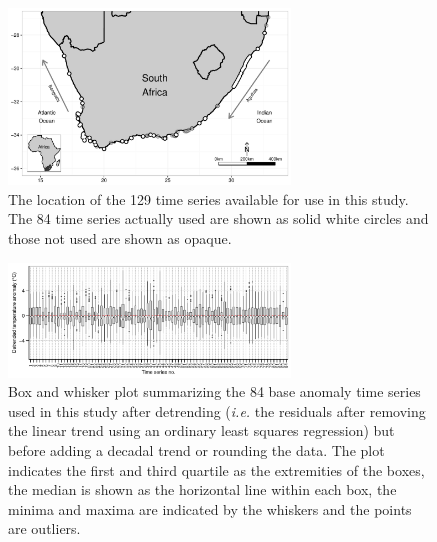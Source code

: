 \documentclass[]{ametsoc}
\begin{document}


%
\begin{figure}
\centering \includegraphics[width=7.5cm]{figure01}
\caption[\small The location of the 129 time series available for use in this study]{The location of the 129 time series available for use in this study. The 84 time series actually used are shown as solid white circles and those not used are shown as opaque.}
\label{figure01}
\end{figure}

\begin{figure}
\centering \includegraphics[width=7.5cm]{figure00}
\caption[\small Box and whisker plots summarizing the anomaly time series of the base 84 data sets]{Box and whisker plot summarizing the 84 base anomaly time series used in this study after detrending (\emph{i.e.} the residuals after removing the linear trend using an ordinary least squares regression) but before adding a decadal trend or rounding the data. The plot indicates the first and third quartile as the extremities of the boxes, the median is shown as the horizontal line within each box, the minima and maxima are indicated by the whiskers and the points are outliers.}
\label{figure00}
\end{figure}
\end{document}
